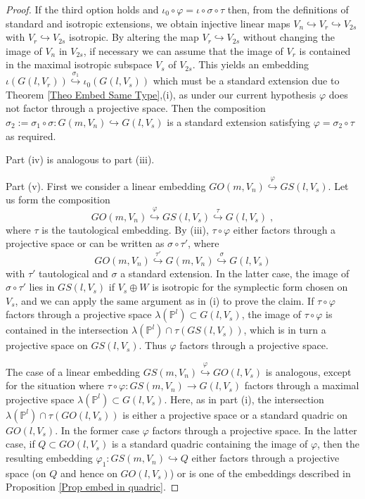 \documentclass[12pt]{amsart}
\def\PP {{\mathbb P}}     %
\begin{document}
\begin{proof}
If the third option holds and $\iota_0\circ \varphi=\iota\circ\sigma\circ \tau$ then, from the definitions of standard and isotropic extensions, we obtain injective linear maps $V_n\hookrightarrow V_r \hookrightarrow V_{2s}$ with $V_r \hookrightarrow V_{2s}$ isotropic. By altering the map $V_r \hookrightarrow V_{2s}$ without changing the image of $V_n$ in $V_{2s}$, if necessary we can assume that the image of $V_r$ is contained in the maximal isotropic subspace $V_s$ of $V_{2s}$. This yields an embedding $\iota(G(l,V_r))\stackrel{\sigma_1}{\hookrightarrow} \iota_0(G(l,V_s))$ which must be a standard extension due to Theorem \ref{Theo Embed Same Type},(i), as under our current hypothesis $\varphi$ does not factor through a projective space. Then the composition $\sigma_2:=\sigma_1\circ\sigma:G(m,V_n)\hookrightarrow G(l,V_s)$ is a standard extension satisfying $\varphi=\sigma_2\circ\tau$ as required.

Part (iv) is analogous to part (iii).

Part (v). First we consider a linear embedding $GO(m,V_n) \stackrel{\varphi}{\hookrightarrow} GS(l,V_s)$. Let us form the composition
$$
GO(m,V_n) \stackrel{\varphi}{\hookrightarrow} GS(l,V_s) \stackrel{\tau}{\hookrightarrow} G(l,V_s) \;,
$$
where $\tau$ is the tautological embedding. By (iii), $\tau\circ\varphi$ either factors through a projective space or can be written as $\sigma\circ\tau'$, where
$$
GO(m,V_n) \stackrel{\tau'}{\hookrightarrow} G(m,V_n) \stackrel{\sigma}{\hookrightarrow} G(l,V_s)
$$
with $\tau'$ tautological and $\sigma$ a standard extension. In the latter case, the image of $\sigma\circ\tau'$ lies in $GS(l,V_s)$ if $V_s\oplus W$ is isotropic for the symplectic form chosen on $V_s$, and we can apply the same argument as in (i) to prove the claim. If $\tau\circ\varphi$ factors through a projective space $\lambda(\PP^l)\subset G(l,V_s)$, the image of $\tau\circ\varphi$ is contained in the intersection $\lambda(\PP^l)\cap \tau(GS(l,V_s))$, which is in turn a projective space on $GS(l,V_s)$. Thus $\varphi$ factors through a projective space.

The case of a linear embedding $GS(m,V_n)\stackrel{\varphi}{\hookrightarrow} GO(l,V_s)$ is analogous, except for the situation where $\tau\circ\varphi:GS(m,V_n)\to G(l,V_s)$ factors through a maximal projective space $\lambda(\PP^l)\subset G(l,V_s)$. Here, as in part (i), the intersection $\lambda(\PP^l)\cap \tau(GO(l,V_s))$ is either a projective space or a standard quadric on $GO(l,V_s)$. In the former case $\varphi$ factors through a projective space. In the latter case, if $Q\subset GO(l,V_s)$ is a standard quadric containing the image of $\varphi$, then the resulting embedding $\varphi_1:GS(m,V_n)\hookrightarrow Q$ either factors through a projective space (on $Q$ and hence on $GO(l,V_s)$) or is one of the embeddings described in Proposition \ref{Prop embed in quadric}.
\end{proof}
\end{document}

